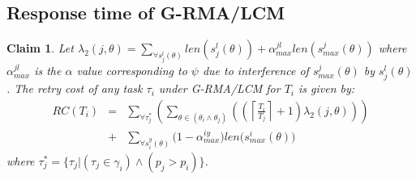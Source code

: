 \documentclass[conference]{sig-alternate}
\newtheorem{clm}{Claim}
\begin{document}

\subsection{Response time of G-RMA/LCM}
\label{rma}

\begin{clm}\label{response g-rma/lcm}
Let $\lambda_{2}(j,\theta)=\sum_{\forall s_{j}^{l}(\theta)}len(s_{j}^{l}(\theta))+\alpha_{max}^{jl}len(s_{max}^{j}(\theta))$ where $\alpha_{max}^{jl}$ is the $\alpha$ value corresponding to $\psi$ due to interference of $s_{max}^j(\theta)$ by $s_j^l(\theta)$. The retry cost of any task $\tau_i$ under G-RMA/LCM for $T_i$ is given by:
\begin{eqnarray}
RC\left(T_i\right) & = &
  \sum_{\forall \tau_{j}^{*}}\left(\sum_{\theta\in(\theta_{i}\wedge\theta_{j})}\left(\left(\left\lceil\frac{T_i}{T_{j}}\right\rceil +1\right)\lambda_{2}(j,\theta)\right)\right)\nonumber\\
& + & \sum_{\forall s_{i}^{y}(\theta)}\Big(1-\alpha_{max}^{iy}\Big)len\Big(s_{max}^i(\theta)\Big)
\label{eq60}
\end{eqnarray}
where $\tau_{j}^{*}=\{\tau_{j}|(\tau_{j}\in\gamma_{i})\wedge(p_{j}>p_{i})\}$.
\end{clm}
\end{document}
